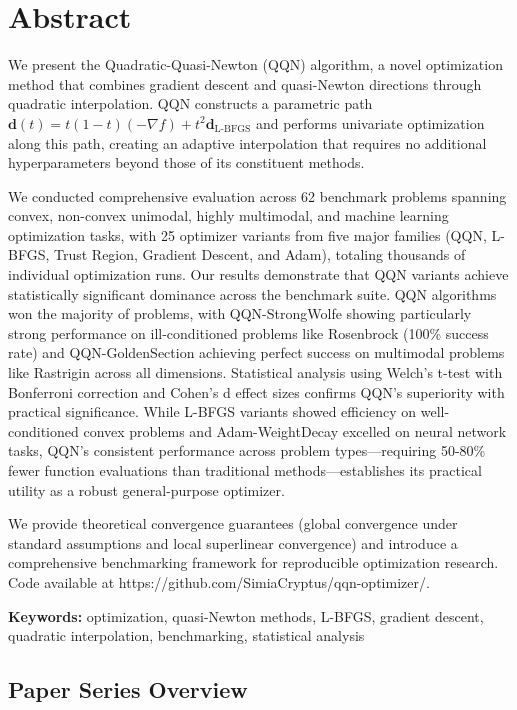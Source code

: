 \hypertarget{abstract}{%
\section{Abstract}\label{abstract}}

We present the Quadratic-Quasi-Newton (QQN) algorithm, a novel optimization method that combines gradient descent and quasi-Newton directions through quadratic interpolation.
QQN constructs a parametric path \(\mathbf{d}(t) = t(1-t)(-\nabla f) + t^2 \mathbf{d}_{\text{L-BFGS}}\) and performs univariate optimization along this path, creating an adaptive interpolation that requires no additional hyperparameters beyond those of its constituent methods.

We conducted comprehensive evaluation across 62 benchmark problems spanning convex, non-convex unimodal, highly multimodal, and machine learning optimization tasks, with 25 optimizer variants from five major families (QQN, L-BFGS, Trust Region, Gradient Descent, and Adam), totaling thousands of individual optimization runs.
Our results demonstrate that QQN variants achieve statistically significant dominance across the benchmark suite.
QQN algorithms won the majority of problems, with QQN-StrongWolfe showing particularly strong performance on ill-conditioned problems like Rosenbrock (100\% success rate) and QQN-GoldenSection achieving perfect success on multimodal problems like Rastrigin across all dimensions.
Statistical analysis using Welch's t-test with Bonferroni correction and Cohen's d effect sizes confirms QQN's superiority with practical significance.
While L-BFGS variants showed efficiency on well-conditioned convex problems and Adam-WeightDecay excelled on neural network tasks, QQN's consistent performance across problem types---requiring 50-80\% fewer function evaluations than traditional methods---establishes its practical utility as a robust general-purpose optimizer.

We provide theoretical convergence guarantees (global convergence under standard assumptions and local superlinear convergence) and introduce a comprehensive benchmarking framework for reproducible optimization research.
Code available at https://github.com/SimiaCryptus/qqn-optimizer/.

\textbf{Keywords:} optimization, quasi-Newton methods, L-BFGS, gradient descent, quadratic interpolation, benchmarking, statistical analysis

\hypertarget{paper-series-overview}{%
\subsection{Paper Series Overview}\label{paper-series-overview}}

